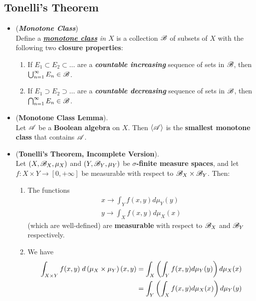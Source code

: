 \documentclass[11pt]{article}
\begin{document}
\subsection{Tonelli's Theorem}
\begin{itemize}
\item \begin{definition} (\textbf{\emph{Monotone Class}})\\
Define a \emph{\textbf{\underline{monotone class}} in $X$} is a collection ${\mathscr B}$ of subsets of $X$ with the following two \textbf{closure properties}:
\begin{enumerate}
\item If $E_1 \subset E_2 \subset \ldots$ are a \textbf{\emph{countable increasing}} sequence of sets in ${\mathscr B}$, then $\bigcup_{n=1}^{\infty}E_n \in {\mathscr B}$.

\item If $E_1 \supset E_2 \supset \ldots$ are a \textbf{\emph{countable decreasing}} sequence of sets in ${\mathscr B}$, then $\bigcap_{n=1}^{\infty}E_n \in {\mathscr B}$.
\end{enumerate}
\end{definition}

\item \begin{lemma} (\textbf{Monotone Class Lemma}). \citep{tao2011introduction}\\
Let ${\mathscr A}$ be a \textbf{Boolean algebra} on $X$. Then $\langle {\mathscr A} \rangle$ is the \textbf{smallest monotone class} that contains ${\mathscr A}$.
\end{lemma}

\item \begin{theorem} (\textbf{Tonelli's Theorem, Incomplete Version}).   \citep{tao2011introduction}\\
Let $(X, {\mathscr B}_X, \mu_X)$ and $(Y, {\mathscr B}_Y, \mu_Y)$ be \textbf{$\sigma$-finite measure spaces}, and let $f : X \times Y \to [0, +\infty]$ be measurable with respect to ${\mathscr B}_X \times {\mathscr B}_Y$. Then:
\begin{enumerate}
\item The functions 
\begin{align*}
x \to \int_Y f(x,y) d\mu_Y(y)\\
y \to \int_X f(x,y) d\mu_X(x)
\end{align*} (which are well-defined) are \textbf{measurable} with respect to ${\mathscr B}_X$ and ${\mathscr B}_Y$ respectively.

\item We have
\begin{align}
\int_{X \times Y} f(x, y) \;d\left(\mu_X \times \mu_Y\right)(x, y) &= \int_X\left(\int_Y f(x, y) d\mu_Y(y)\right) d\mu_X(x) \nonumber\\
&=  \int_Y\left(\int_Xf(x, y) d\mu_X(x) \right)d\mu_Y(y)  \label{eqn: tonelli_theorem_1}
\end{align}
\end{enumerate}
\end{theorem}


\end{itemize}
\end{document}
